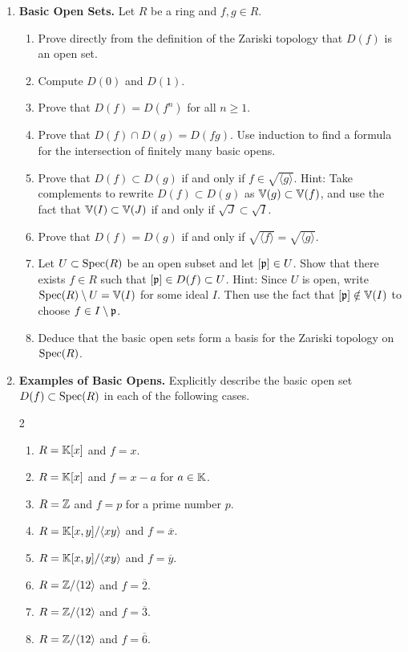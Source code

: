 \documentclass[12pt,reqno]{amsart}
\begin{document}
\begin{enumerate}[leftmargin=*, series=problems]

\item \textbf{Basic Open Sets.} Let $R$ be a ring and $f,g \in R$.
\begin{enumerate}
	\item Prove directly from the definition of the Zariski topology that $D(f)$ is an open set. 
	\item Compute $D(0)$ and $D(1)$. 
	\item Prove that $D(f) = D(f^{n})$ for all $n\geq1$. 
	\item Prove that $D(f) \cap D(g) = D(fg)$. Use induction to find a formula for the intersection of finitely many basic opens. 
	\item Prove that $D(f)\subset D(g)$ if and only if $f\in \sqrt{\langle g\rangle}$. Hint: Take complements to rewrite $D(f)\subset D(g)$ as $\mathbb{V}(g)\subset \mathbb{V}(f)$, and use the fact that $\mathbb{V}(I)\subset \mathbb{V}(J)$ if and only if $\sqrt{J}\subset \sqrt{I}$.
	\item Prove that $D(f) = D(g)$ if and only if $\sqrt{\langle f \rangle} = \sqrt{\langle g \rangle}$. 
	\item Let $U\subset \operatorname{Spec}(R)$ be an open subset and let $[\mathfrak{p}] \in U$. Show that there exists $f\in R$ such that $[\mathfrak{p}] \in D(f) \subset U$. Hint: Since $U$ is open, write $\operatorname{Spec}(R)\setminus U=\mathbb{V}(I)$ for some ideal $I$. Then use the fact that $[\mathfrak{p}]\notin \mathbb{V}(I)$ to choose $f\in I\setminus \mathfrak{p}$.
	\item Deduce that the basic open sets form a basis for the Zariski topology on $\operatorname{Spec}(R)$. 
\end{enumerate}

\item \textbf{Examples of Basic Opens.} Explicitly describe the basic open set $D(f) \subset \operatorname{Spec}(R)$ in each of the following cases. 
\begin{multicols}{2}
\begin{enumerate}
	\item $R=\mathbb{K}[x]$ and $f=x$.
	\item $R=\mathbb{K}[x]$ and $f=x-a$ for $a\in \mathbb{K}$.
	\item $R=\mathbb{Z}$ and $f=p$ for a prime number $p$.
	\item $R=\mathbb{K}[x,y]/\langle xy\rangle$ and $f=\overline{x}$.
	\item $R=\mathbb{K}[x,y]/\langle xy\rangle$ and $f=\overline{y}$.
	\item $R=\mathbb{Z}/\langle12\rangle$ and $f=\overline{2}$.
	\item $R=\mathbb{Z}/\langle12\rangle$ and $f=\overline{3}$.
	\item $R=\mathbb{Z}/\langle12\rangle$ and $f=\overline{6}$.
\end{enumerate}
\end{multicols}
 

\end{enumerate}
\end{document}
